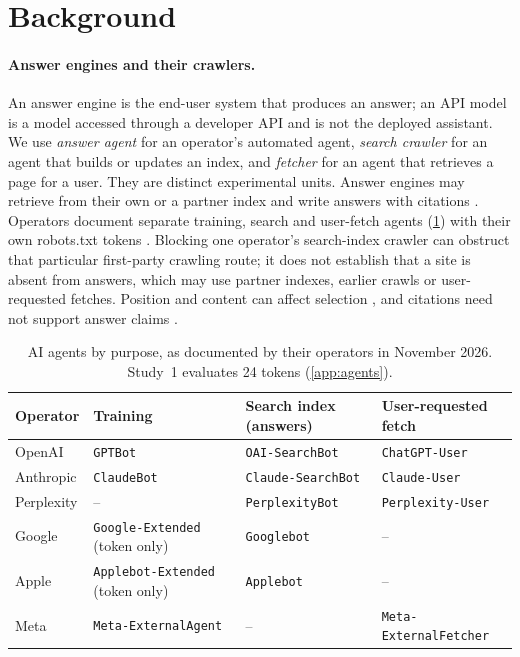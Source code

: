 \documentclass[11pt]{article}
\newcommand{\agent}[1]{\texttt{#1}}
\begin{document}
\section{Background}
\label{sec:background}

\paragraph{Answer engines and their crawlers.}
An answer engine is the end-user system that produces an answer; an API model is a model accessed through a developer
API and is not the deployed assistant. We use \emph{answer agent} for an operator's automated agent, \emph{search
crawler} for an agent that builds or updates an index, and \emph{fetcher} for an agent that retrieves a page for a user.
They are distinct experimental units. Answer engines may retrieve from their own or a partner index and write answers
with citations \citep{lewis2020rag,google2026aifeatures}. Operators document separate training, search and user-fetch
agents (\cref{tab:agents}) with their own robots.txt tokens
\citep{openai2026bots,anthropic2026bots,perplexity2026bots,google2026crawlers}. Blocking one operator's search-index
crawler can obstruct that particular first-party crawling route; it does not establish that a site is absent from
answers, which may use partner indexes, earlier crawls or user-requested fetches. Position and content can affect
selection \citep{liu2024lost,zheng2024selectors,pfrommer2024ranking}, and citations need not support answer claims
\citep{liu2023verifiability,jazwinska2025citation}.

\begin{table}[tp]
\centering\small
\caption{AI agents by purpose, as documented by their operators in November 2026. Study~1 evaluates 24 tokens
(\cref{app:agents}).}
\label{tab:agents}
\begin{tabular}{@{}llll@{}}
\toprule
Operator & Training & Search index (answers) & User-requested fetch \\
\midrule
OpenAI & \agent{GPTBot} & \agent{OAI-SearchBot} & \agent{ChatGPT-User} \\
Anthropic & \agent{ClaudeBot} & \agent{Claude-SearchBot} & \agent{Claude-User} \\
Perplexity & -- & \agent{PerplexityBot} & \agent{Perplexity-User} \\
Google & \agent{Google-Extended} (token only) & \agent{Googlebot} & -- \\
Apple & \agent{Applebot-Extended} (token only) & \agent{Applebot} & -- \\
Meta & \agent{Meta-ExternalAgent} & -- & \agent{Meta-ExternalFetcher} \\
\bottomrule
\end{tabular}
\end{table}
\end{document}
